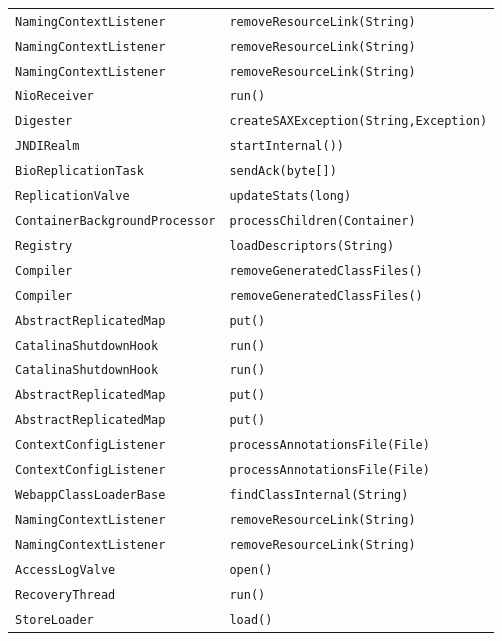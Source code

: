 \begin{center}
\begin{longtable}{ll}
\lstinline/NamingContextListener/&{\lstinline/removeResourceLink(String)/}\\
\lstinline/NamingContextListener/&{\lstinline/removeResourceLink(String)/}\\
\lstinline/NamingContextListener/&{\lstinline/removeResourceLink(String)/}\\
\lstinline/NioReceiver/&{\lstinline/run()/}\\
\lstinline/Digester/&{\lstinline/createSAXException(String,Exception)/}\\
\lstinline/JNDIRealm/&{\lstinline/startInternal())/}\\
\lstinline/BioReplicationTask/&{\lstinline/sendAck(byte[])/}\\
\lstinline/ReplicationValve/&{\lstinline/updateStats(long)/}\\
\lstinline/ContainerBackgroundProcessor/&{\lstinline/processChildren(Container)/}\\
\lstinline/Registry/&{\lstinline/loadDescriptors(String)/}\\
\lstinline/Compiler/&{\lstinline/removeGeneratedClassFiles()/}\\
\lstinline/Compiler/&{\lstinline/removeGeneratedClassFiles()/}\\
\lstinline/AbstractReplicatedMap/&{\lstinline/put()/}\\
\lstinline/CatalinaShutdownHook/&{\lstinline/run()/}\\
\lstinline/CatalinaShutdownHook/&{\lstinline/run()/}\\
\lstinline/AbstractReplicatedMap/&{\lstinline/put()/}\\
\lstinline/AbstractReplicatedMap/&{\lstinline/put()/}\\
\lstinline/ContextConfigListener/&{\lstinline/processAnnotationsFile(File)/}\\
\lstinline/ContextConfigListener/&{\lstinline/processAnnotationsFile(File)/}\\
\lstinline/WebappClassLoaderBase/&{\lstinline/findClassInternal(String)/}\\
\lstinline/NamingContextListener/&{\lstinline/removeResourceLink(String)/}\\
\lstinline/NamingContextListener/&{\lstinline/removeResourceLink(String)/}\\
\lstinline/AccessLogValve/&{\lstinline/open()/}\\
\lstinline/RecoveryThread/&{\lstinline/run()/}\\
\lstinline/StoreLoader/&{\lstinline/load()/}\\

\end{longtable}
\end{center}
